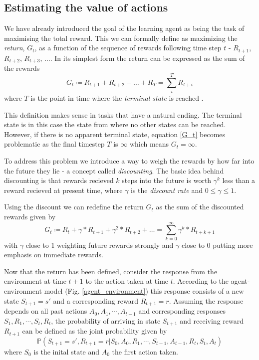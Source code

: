 \documentclass[11pt]{article}
\begin{document}
\maketitle


\subsection{Estimating the value of actions}

We have already introduced the goal of the learning agent as being the
task of maximising the total reward.
This we can formally define as maximizing the \textit{return}, $G_t$, as
a function of the sequence of rewards following time step $t$ - $R_{t+1}$,
$R_{t+2}$, $R_{t+3}$, $\hdots$.
In its simplest form the return can be expressed as the sum of the
rewards
\begin{equation}\label{G_t}
    G_t \coloneqq R_{t+1} + R_{t+2} + \hdots + R_{T} = \sum\limits_{i}^T R_{t+i}
\end{equation}
where $T$ is the point in time where the \textit{terminal state} is reached
\cite{RLBook}.

This definition makes sense in tasks that have a natural ending.
The terminal state is in this case the state from where no
other states can be reached.
However, if there is no apparent terminal state, equation \ref{G_t}
becomes problematic as the final timestep $T$ is $\infty$ which means $G_t = \infty$.

To address this problem we introduce a way to weigh the rewards by how far into the
future they lie - a concept called \textit{discounting}.
The basic idea behind discounting is that rewards recieved $k$ steps into the future
is worth $\gamma^k$ less than a reward recieved at present time, where
$\gamma$ is the \textit{discount rate} and $0 \leq \gamma \leq 1$.

Using the discount we can redefine the return $G_t$ as the sum of the discounted
rewards given by
\begin{equation}\label{gammaG_t}
    G_t \coloneqq R_t + \gamma * R_{t+1} + \gamma^2 * R_{t+2} + \hdots 
        = \sum\limits_{k=0}^\infty \gamma^k * R_{t+k+1}
\end{equation}
with $\gamma$ close to 1 weighting future rewards strongly and $\gamma$ close to 0
putting more emphasis on immediate rewards.


Now that the return has been defined, consider the response from the environment at time $t + 1$
to the action taken at time $t$.
According to the agent-environment model (Fig. \ref{agent_environment}) this response consists
of a new state $S_{t+1} = s'$ and a corresponding reward $R_{t+1} = r$.
Assuming the response depends on all past actions $A_{0}, A_{1}, \cdots, A_{t-1}$ and
corresponding responses $S_{1}, R_{1}, \cdots, S_{t}, R_{t}$, the probability
of arriving in state $S_{t+1}$ and receiving reward $R_{t+1}$ can be defined as the
joint probability given by
\begin{equation}
    \mathds{P}(S_{t+1} = s', R_{t+1} = r | S_0, A_0, R_1, \cdots, S_{t-1}, A_{t-1}, R_{t}, S_{t}, A_{t})
\end{equation}
where $S_0$ is the inital state and $A_0$ the first action taken.
\end{document}

